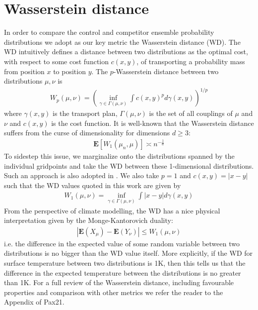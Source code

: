 \documentclass[fleqn,usenatbib,useAMS]{mnras}
\begin{document}
\section{Wasserstein distance}
In order to compare the control and competitor ensemble probability distributions we adopt as our key metric the Wasserstein distance (WD). The WD intuitively defines a distance between two distributions as the optimal cost, with respect to some cost function $c(x,y)$,  of transporting a probability mass from position $x$ to position $y$. The $p$-Wasserstein distance between two distributions $\mu, \nu$ is
\begin{eqnarray}
	W_p(\mu,\nu)= \left( \inf_{\gamma \in \Gamma(\mu, \nu)}  \int c(x,y)^p d \gamma (x,y)\right)^{1/p}
\end{eqnarray}
where $\gamma(x,y)$ is the transport plan, $\Gamma(\mu, \nu)$ is the set of all couplings of $\mu$ and $\nu$ and $c(x,y)$ is the cost function. It is well-known \cite{Dudley} that the Wasserstein distance suffers from the curse of dimensionality for dimensions $d \geq 3$:
\begin{eqnarray}
	\boldsymbol{E} [W_1(\mu_n,\mu)] \asymp n^{-\frac{1}{d}}
\end{eqnarray}
To sidestep this issue, we marginalize onto the distributions spanned by the individual gridpoints and take the WD between these 1-dimensional distributions. Such an approach is also adopted in \cite{Paxton2021,Vissio2020}. We also take $p=1$ and $c(x,y) = |x-y|$ such that the WD values quoted in this work are given by
\begin{eqnarray}
	W_1(\mu,\nu)=  \inf_{\gamma \in \Gamma(\mu, \nu)} \int |x-y| d \gamma (x,y)
\end{eqnarray}
From the perspective of climate modelling, the WD has a nice physical interpretation given by the Monge-Kantorovich duality:
\begin{eqnarray}
	| \boldsymbol{E}(X_{\mu} )-\boldsymbol{E}(Y_{\nu} ) | \leq W_1(\mu, \nu) \label{eq:WDdefn}
\end{eqnarray}
i.e. the difference in the expected value of some random variable between two distributions is no bigger than the WD value itself. More explicitly, if the WD for surface temperature between two distributions is 1K, then this tells us that the difference in the expected temperature between the distributions is no greater than 1K. For a full review of the Wasserstein distance, including favourable properties and comparison with other metrics we refer the reader to the Appendix of Pax21.
\end{document}

